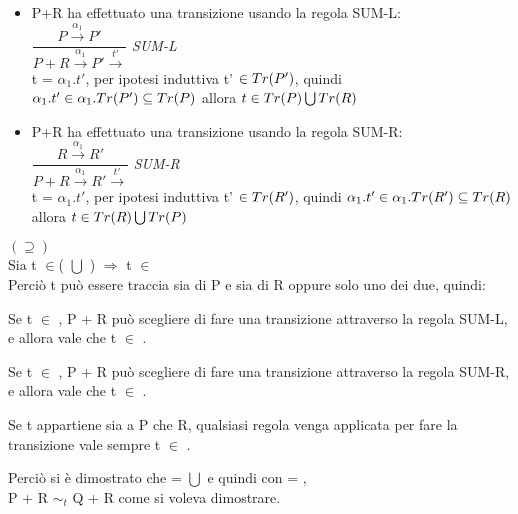 \begin{itemize}
	\item P+R ha effettuato una transizione usando la regola SUM-L:\\
	
	 	$\dfrac{P \overset{\alpha_{1}}\rightarrow P'}{P + R \overset{\alpha_{1}}\rightarrow P'\overset{t'}\rightarrow}$ \textit{SUM-L} \\
	 	
	 	t = $\alpha_{1}.t'$, per ipotesi induttiva t' $\in Tr(P')$, quindi 
	 	$\alpha_{1}.t' \in \alpha_{1}.Tr(P')\subseteq Tr(P) $ allora $t \in Tr(P) \bigcup Tr(R)$
	 	\\
	 	
	 \item P+R ha effettuato una transizione usando la regola SUM-R:\\
	 
	 $\dfrac{R \overset{\alpha_{1}}\rightarrow R'}{P + R \overset{\alpha_{1}}\rightarrow R'\overset{t'}\rightarrow}$ \textit{SUM-R} \\
	 
		t = $\alpha_{1}.t'$, per ipotesi induttiva t' $\in Tr(R')$, quindi 
	$\alpha_{1}.t' \in \alpha_{1}.Tr(R')\subseteq Tr(R) $ allora $t \in Tr(R) \bigcup Tr(P)$
	\\
	 	
\end{itemize}

$(\supseteq)$\\

Sia t $\in$( $\bigcup$ ) $\Rightarrow $  t $\in$\\
Perciò t può essere traccia sia di P e sia di R oppure solo uno dei due, quindi:

Se t $\in$ , P + R può scegliere di fare una transizione attraverso la regola SUM-L, e allora vale che t $\in$ .

Se t $\in$ , P + R può scegliere di fare una transizione attraverso la regola SUM-R, e allora vale che t $\in$ .

Se t appartiene sia a P che R, qualsiasi regola venga applicata per fare la transizione vale sempre t $\in$ .

Perciò si è dimostrato che  =  $\bigcup$  e quindi con  = ,\\ P + R $\sim_{t}$ Q + R come si voleva dimostrare.
